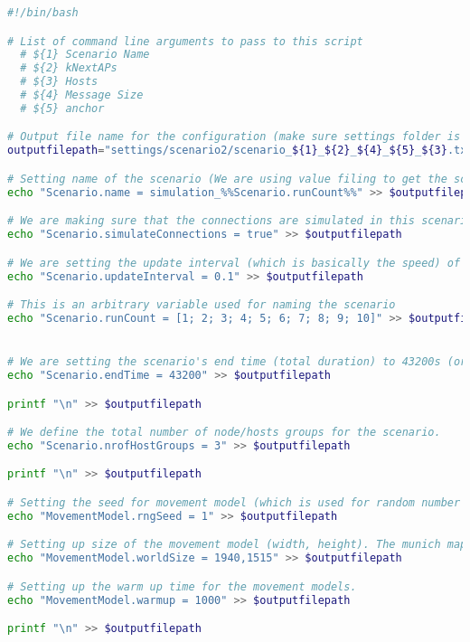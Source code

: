 \begin{lstlisting}[language=bash]
#!/bin/bash

# List of command line arguments to pass to this script
  # ${1} Scenario Name
  # ${2} kNextAPs
  # ${3} Hosts
  # ${4} Message Size
  # ${5} anchor

# Output file name for the configuration (make sure settings folder is already created). The file is named as  scenario_ScenarioName_kNextAPs_AnchorSize_MessageSize_HostsCount.txt
outputfilepath="settings/scenario2/scenario_${1}_${2}_${4}_${5}_${3}.txt"

# Setting name of the scenario (We are using value filing to get the scenario number from Scenario.runCount using value filing)
echo "Scenario.name = simulation_%%Scenario.runCount%%" >> $outputfilepath

# We are making sure that the connections are simulated in this scenario
echo "Scenario.simulateConnections = true" >> $outputfilepath

# We are setting the update interval (which is basically the speed) of the simulation
echo "Scenario.updateInterval = 0.1" >> $outputfilepath

# This is an arbitrary variable used for naming the scenario
echo "Scenario.runCount = [1; 2; 3; 4; 5; 6; 7; 8; 9; 10]" >> $outputfilepath


# We are setting the scenario's end time (total duration) to 43200s (or 12 hours)
echo "Scenario.endTime = 43200" >> $outputfilepath

printf "\n" >> $outputfilepath

# We define the total number of node/hosts groups for the scenario.
echo "Scenario.nrofHostGroups = 3" >> $outputfilepath

printf "\n" >> $outputfilepath

# Setting the seed for movement model (which is used for random number generation). A number of parameters of movement models are generated using random numbers. Having the same seed produces the same random numbers.
echo "MovementModel.rngSeed = 1" >> $outputfilepath

# Setting up size of the movement model (width, height). The munich map we are using is 1940 meters wide and 1515 meters long.
echo "MovementModel.worldSize = 1940,1515" >> $outputfilepath

# Setting up the warm up time for the movement models.
echo "MovementModel.warmup = 1000" >> $outputfilepath

printf "\n" >> $outputfilepath


\end{lstlisting}
